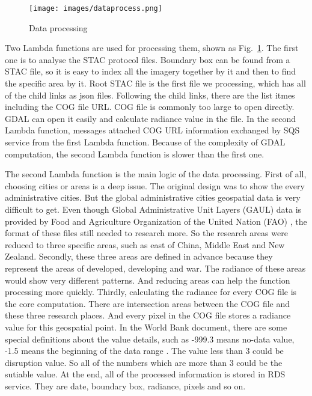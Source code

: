 \documentclass[conference]{IEEEtran}
\begin{document}
	
	\begin{figure}[htbp]
		\centerline{\texttt{[image: images/dataprocess.png]}}
		\caption{Data processing}
		\label{fig4}
	\end{figure}
	
	Two Lambda functions are used for processing them, shown as Fig.~\ref{fig4}. The first one is to analyse the STAC protocol files. Boundary box can be found from a STAC file, so it is easy to index
	all the imagery together by it and then to find the specific area by it. Root STAC file is the first file we processing, which has all of the child links as json files. 
	Following the child links, there are the list itmes including the COG file URL. COG file is commonly too large to open directly. GDAL can open it easily and calculate radiance 
	value in the file. In the second Lambda function, messages attached COG URL information exchanged by SQS service from the first Lambda function. Because of the complexity 
	of GDAL computation, the second Lambda function is slower than the first one.
	
	The second Lambda function is the main logic of the data processing. First of all, choosing cities or areas is a deep issue. The original design was to show the every administrative 
	cities. But the global administrative cities geospatial data is very difficult to get. Even though Global Administrative Unit Layers (GAUL) data is provided by Food and 
	Agriculture Organization of the United Nation (FAO) \cite{GlobalAd98:online}, the format of these files still needed to research more. So the research areas were reduced 
	to three specific areas, such as east of China, Middle East and New Zealand. Secondly, these three areas are defined in advance because they represent the areas of developed, 
	developing and war. The radiance of these areas would show very different patterns. And reducing areas can help the function processing more quickly. Thirdly, calculating the 
	radiance for every COG file is the core computation. There are intersection areas between the COG file and these three research places. And every pixel in the COG file stores 
	a radiance value for this geospatial point. In the World Bank document, there are some special definitions about the value details, such as -999.3 means no-data value, -1.5 
	means the beginning of the data range \cite{WorldBan13:online}. The value less than 3 could be disruption value. So all of the numbers which are more than 3 could be the 
	sutiable value. At the end, all of the processed information is stored in RDS service. They are date, boundary box, radiance, pixels and so on.
	
\end{document}
